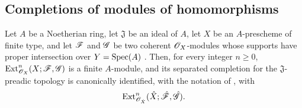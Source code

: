 \subsection{Completions of modules of homomorphisms}
\label{subsection:III.4.5}

\begin{proposition}[4.5.1]
\label{III.4.5.1}
Let $A$ be a Noetherian ring, let $\mathfrak J$ be an ideal of $A$,
let $X$ be an $A$-prescheme of finite type, and let $\mathscr{F}$ and
$\mathscr{G}$ be two coherent $\mathscr{O}_X$-modules whose supports have
proper intersection over $Y=\operatorname{Spec}(A)$ .  Then,
for every integer $n\geq0$, $\operatorname{Ext}^n_{\mathscr{O}_X}(X;\mathscr{F},\mathscr{G})$
is a finite $A$-module, and its separated completion for the
$\mathfrak J$-preadic topology is canonically identified, with the
notation of , with
\[
  \operatorname{Ext}^n_{\mathscr{O}_{\hat{X}}}
    (\hat{X};\hat{\mathscr{F}},\hat{\mathscr{G}}).
\]
\end{proposition}

